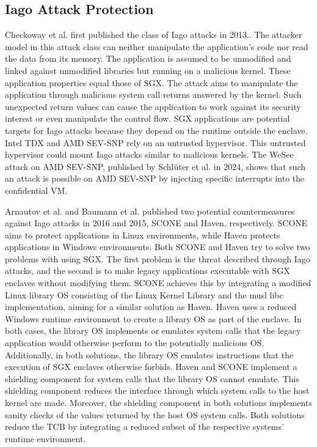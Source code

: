 \subsection{Iago Attack Protection}
\label{sec:20:iago}
Checkoway et al. first published the class of Iago attacks in 2013.\cite{checkoway2013iago}. The attacker model in this
attack class can neither manipulate the application's code nor read the data from its memory. The
application is assumed to be unmodified and linked against unmodified libraries but running on a malicious kernel.
These application properties equal those of SGX. The attack aims to manipulate the application through
malicious system call returns answered by the kernel. Such unexpected return values can cause the application to work
against its security interest or even manipulate the control flow.
SGX applications are potential targets for Iago attacks because they depend on the runtime outside the
enclave. Intel TDX and AMD SEV-SNP rely on an untrusted hypervisor.\cite{tdx_whitepaper,kaplan_amd_2020}
This untrusted hypervisor could mount Iago attacks similar to malicious kernels. The WeSee attack on
AMD SEV-SNP, published by Schlüter et al. in 2024, shows that such an attack is possible on AMD SEV-SNP by
injecting specific interrupts into the confidential VM.\cite{schluter2024wesee}

Arnautov et al. and Baumann et al. published two potential countermeasures against Iago attacks in 2016 and 2015,
SCONE and Haven, respectively. SCONE aims to protect applications in Linux environments, while Haven protects
applications in Windows environments.\cite{arnautov_scone_2016, baumann_shielding_2015}
Both SCONE and Haven try to solve two problems with using SGX. The first problem is the threat described through Iago
attacks, and the second is to make legacy applications executable with SGX enclaves without
modifying them. SCONE achieves this by integrating a modified Linux library OS consisting of the Linux Kernel Library
and the musl libc implementation, aiming for a similar solution as Haven. Haven uses a reduced Windows runtime
environment to create a library OS as part of the enclave. In both cases, the library OS implements or emulates system
calls that the legacy application would otherwise perform to the potentially malicious OS. Additionally, in both
solutions, the library OS emulates instructions that the execution of SGX enclaves otherwise forbids. Haven and SCONE
implement a shielding component for system calls that the library OS cannot emulate. This shielding component
reduces the interface through which system calls to the host kernel are made. Moreover, the shielding component in both
solutions implements sanity checks of the values returned by the host OS system calls. Both solutions reduce the TCB by
integrating a reduced subset of the respective systems' runtime environment.
